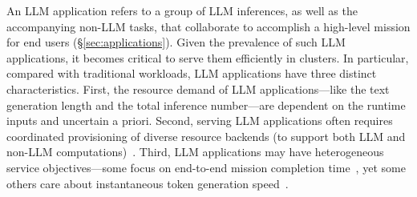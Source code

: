 
An LLM application refers to a group of LLM inferences, as well as the accompanying non-LLM tasks, that collaborate to accomplish a high-level mission for end users (\S\ref{sec:applications}).
Given the prevalence of such LLM applications, it becomes critical to serve them efficiently in clusters.
In particular, compared with traditional workloads, LLM applications have three distinct characteristics. 
First, the resource demand of LLM applications---like the text generation length and the total inference number---are dependent on the runtime inputs and uncertain a priori.
Second, serving LLM applications often requires coordinated provisioning of diverse resource backends (to support both LLM and non-LLM computations)~\cite{lewis2020retrieval,factool_code}. 
Third, LLM applications may have heterogeneous service objectives---some focus on end-to-end mission completion time~\cite{autogen,jin2024comprehensive}, yet some others care about instantaneous token generation speed~\cite{liu2024andes}.

